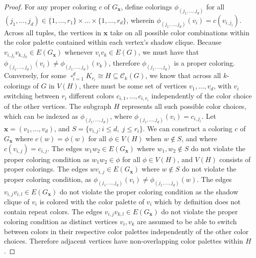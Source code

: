 \documentclass[12pt,reqno,dvipsnames]{amsart}
\theoremstyle{definition}
\begin{document}
\begin{proof}
For any proper coloring $c$ of $G_\mathbf{x}$, define colorings $\phi_{(j_1,\dots,j_d)}$ for all $(j_1,\dots,j_d)\in \{1,\dots,r_1\}\times\dots\times\{1,\dots,r_d\}$, wherein $\phi_{(j_1,\dots,j_d)}(v_i)=c(v_{i,j_i})$. Across all tuples, the vertices in $\mathbf{x}$ take on all possible color combinations within the color palette contained within each vertex's shadow clique. Because $v_{i,j_i}v_{k,j_k} \in E(G_\mathbf{x})$ whenever $v_iv_k\in E(G)$, we must have that $\phi_{(j_1,\dots,j_d)}(v_i)\ne \phi_{(j_1,\dots,j_d)}(v_k)$, therefore $\phi_{(j_1,\dots,j_d)}$ is a proper coloring. Conversely, for some $\mathop{\square}_{i=1}^d K_{r_i}\cong H \subseteq \mathcal{C}_k(G)$, we know that across all $k$-colorings of $G$ in $V(H)$, there must be some set of vertices $v_1,\dots,v_d$, with $v_i$ switching between $r_i$ different colors $c_{i,1},\dots, c_{i,r_i}$ independently of the color choice of the other vertices. The subgraph $H$ represents all such possible color choices, which can be indexed as $\phi_{(j_1,\dots,j_d)}$, where $\phi_{(j_1,\dots,j_d)}(v_i)=c_{i,j_i}$. Let $\mathbf{x}=(v_1,\dots,v_d)$, and $S=\{v_{i,j} : i\le d,\; j\le r_i\}$. We can construct a coloring $c$ of $G_\mathbf{x}$ where $c(w)=\phi(w)$ for all $\phi \in V(H)$ when $w\notin S$, and where $c(v_{i,j})=c_{i,j}$. The edges $w_1w_2\in E(G_\mathbf{x})$ where $w_1,w_2\notin S$ do not violate the proper coloring condition as $w_1w_2\in \phi$ for all $\phi \in V(H)$, and $V(H)$ consists of proper colorings. The edges $w v_{i,j} \in E(G_\mathbf{x})$ where $w\notin S$ do not violate the proper coloring condition, as $\phi_{(j_1,\dots,j_d)}(v_i)\ne \phi_{(j_1,\dots,j_d)}(w)$. The edges $v_{i,j}v_{i,l}\in E(G_\mathbf{x})$ do not violate the proper coloring condition as the shadow clique of $v_i$ is colored with the color palette of $v_i$ which by definition does not contain repeat colors. The edges $v_{i,j}v_{k,l}\in E(G_\mathbf{x})$ do not violate the proper coloring condition as distinct vertices $v_i,v_k$ are assumed to be able to switch between colors in their respective color palettes independently of the other color choices. Therefore adjacent vertices have non-overlapping color palettes within $H$.


\end{proof}
\end{document}
